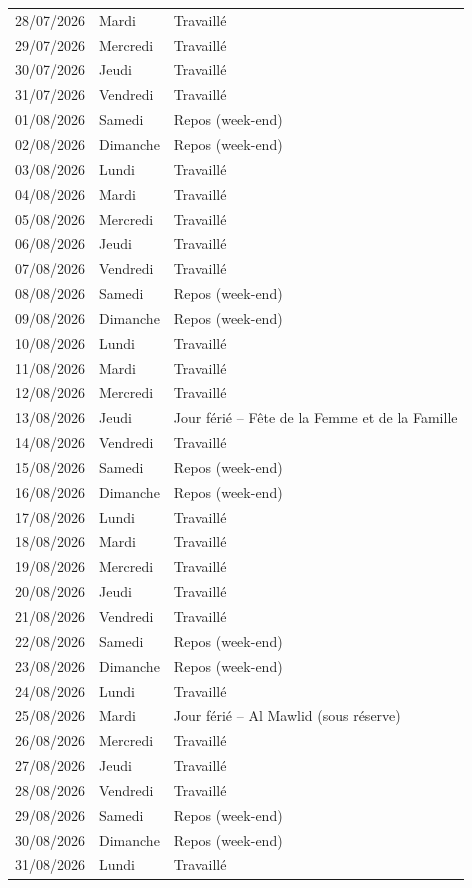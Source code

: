 \documentclass[11pt,a4paper]{article}
\begin{document}
{\begin{longtable}{l l l}
28/07/2026 & Mardi & Travaillé \\
29/07/2026 & Mercredi & Travaillé \\
30/07/2026 & Jeudi & Travaillé \\
31/07/2026 & Vendredi & Travaillé \\
01/08/2026 & Samedi & Repos (week-end) \\
02/08/2026 & Dimanche & Repos (week-end) \\
03/08/2026 & Lundi & Travaillé \\
04/08/2026 & Mardi & Travaillé \\
05/08/2026 & Mercredi & Travaillé \\
06/08/2026 & Jeudi & Travaillé \\
07/08/2026 & Vendredi & Travaillé \\
08/08/2026 & Samedi & Repos (week-end) \\
09/08/2026 & Dimanche & Repos (week-end) \\
10/08/2026 & Lundi & Travaillé \\
11/08/2026 & Mardi & Travaillé \\
12/08/2026 & Mercredi & Travaillé \\
13/08/2026 & Jeudi & Jour férié -- Fête de la Femme et de la Famille \\
14/08/2026 & Vendredi & Travaillé \\
15/08/2026 & Samedi & Repos (week-end) \\
16/08/2026 & Dimanche & Repos (week-end) \\
17/08/2026 & Lundi & Travaillé \\
18/08/2026 & Mardi & Travaillé \\
19/08/2026 & Mercredi & Travaillé \\
20/08/2026 & Jeudi & Travaillé \\
21/08/2026 & Vendredi & Travaillé \\
22/08/2026 & Samedi & Repos (week-end) \\
23/08/2026 & Dimanche & Repos (week-end) \\
24/08/2026 & Lundi & Travaillé \\
25/08/2026 & Mardi & Jour férié -- Al Mawlid (sous réserve) \\
26/08/2026 & Mercredi & Travaillé \\
27/08/2026 & Jeudi & Travaillé \\
28/08/2026 & Vendredi & Travaillé \\
29/08/2026 & Samedi & Repos (week-end) \\
30/08/2026 & Dimanche & Repos (week-end) \\
31/08/2026 & Lundi & Travaillé \\
\bottomrule
\end{longtable}
}
\end{document}

